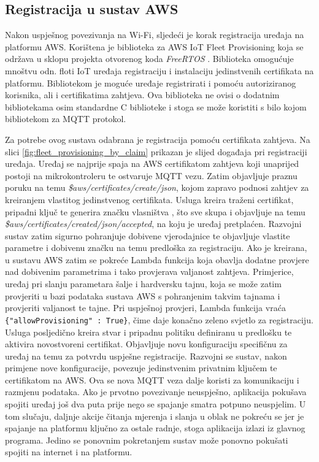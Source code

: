 \subsection{Registracija u sustav AWS}

Nakon uspješnog povezivanja na Wi-Fi, sljedeći je korak registracija uređaja na platformu AWS. Korištena je biblioteka za AWS IoT Fleet Provisioning koja se održava u sklopu projekta otvorenog koda \textit{FreeRTOS} \cite{fleet_prov_sdk}. Biblioteka omogućuje mnoštvu odn. floti IoT uređaja registraciju i instalaciju jedinstvenih certifikata na platformu. Bibliotekom je moguće uređaje registrirati i pomoću autoriziranog korisnika, ali i certifikatima zahtjeva. Ova biblioteka ne ovisi o dodatnim bibliotekama osim standardne C biblioteke i stoga se može koristiti s bilo kojom bibliotekom za MQTT protokol.

Za potrebe ovog sustava odabrana je registracija pomoću certifikata zahtjeva. Na slici \ref{fig:fleet_provisioning_by_claim} prikazan je slijed događaja pri registraciji uređaja. Uređaj se najprije spaja na AWS certifikatom zahtjeva koji unaprijed postoji na mikrokontroleru te ostvaruje MQTT vezu. Zatim objavljuje praznu poruku na temu \textit{\$aws/certificates/create/json}, kojom zapravo podnosi zahtjev za kreiranjem vlastitog jedinstvenog certifikata. Usluga kreira traženi certifikat, pripadni ključ te generira značku vlasništva , što sve skupa i objavljuje na temu \textit{\$aws/certificates/created/json/accepted}, na koju je uređaj pretplaćen. Razvojni sustav zatim sigurno pohranjuje dobivene vjerodajnice te objavljuje vlastite parametre i dobivenu značku na temu predloška za registraciju. Ako je kreirana, u sustavu AWS zatim se pokreće Lambda funkcija koja obavlja dodatne provjere nad dobivenim parametrima i tako provjerava valjanost zahtjeva. Primjerice, uređaj pri slanju parametara šalje i hardversku tajnu, koja se može zatim provjeriti u bazi podataka sustava AWS s pohranjenim takvim tajnama i provjeriti valjanost te tajne. Pri uspješnoj provjeri, Lambda funkcija vraća \lstinline|{"allowProvisioning" : True}|, čime daje konačno zeleno svjetlo za registraciju. Usluga posljedično kreira stvar i pripadnu politiku definiranu u predlošku te aktivira novostvoreni certifikat. Objavljuje novu konfiguraciju specifičnu za uređaj na temu za potvrdu uspješne registracije. Razvojni se sustav, nakon primjene nove konfiguracije, povezuje jedinstvenim privatnim ključem te certifikatom na AWS. Ova se nova MQTT veza dalje koristi za komunikaciju i razmjenu podataka. Ako je prvotno povezivanje neuspješno, aplikacija pokušava spojiti uređaj još dva puta prije nego se spajanje smatra potpuno neuspjelim. U tom slučaju, daljnje akcije čitanja mjerenja i slanja u oblak ne pokreću se jer je spajanje na platformu ključno za ostale radnje, stoga aplikacija izlazi iz glavnog programa. Jedino se ponovnim pokretanjem sustav može ponovno pokušati spojiti na internet i na platformu. 

